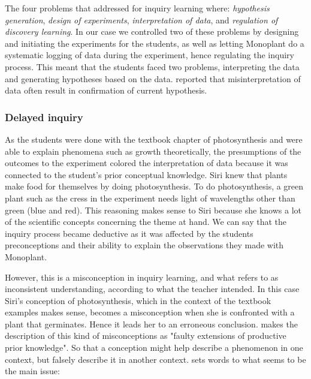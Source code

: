 The four problems that \citet{de1998scientific} addressed for inquiry learning where: \textit{hypothesis generation}, \textit{design of experiments}, \textit{interpretation of data}, and \textit{regulation of discovery learning}. In our case we controlled two of these problems by designing and initiating the experiments for the students, as well as letting Monoplant do a systematic logging of data during the experiment, hence regulating the inquiry process. This meant that the students faced two problems, interpreting the data and generating hypotheses based on the data. \citeauthor*{klahr1993heuristics} \citetext{\citeyear{klahr1993heuristics}, referenced in \citealp{de1998scientific}} reported that misinterpretation of data often result in confirmation of current hypothesis. 



\subsubsection*{Delayed inquiry}
As the students were done with the textbook chapter of photosynthesis and were able to explain  phenomena such as growth theoretically, the presumptions of the outcomes to the experiment colored the interpretation of data because it was connected to the student's prior conceptual knowledge. Siri knew that plants make food for themselves by doing photosynthesis. To do photosynthesis, a green plant such as the cress in the experiment needs light of wavelengths other than green (blue and red). This reasoning makes sense to Siri because she knows a lot of the scientific concepts concerning the theme at hand. We can say that the inquiry process became deductive as it was affected by the students preconceptions and their ability to explain the observations they made with Monoplant. 

However, this is a misconception in inquiry learning, and what \citet{gomez2008elementary} refers to as inconsistent understanding, according to what the teacher intended. In this case Siri's conception of photosynthesis, which in the context of the textbook examples makes sense, becomes a misconception when she is confronted with a plant that germinates. Hence it leads her to an erroneous conclusion. \citet{smith1994misconceptions} makes the description of this kind of misconceptions as "faulty extensions of productive prior knowledge". So that a conception might help describe a phenomenon in one context, but falsely describe it in another context. \citeauthor{klahr1993heuristics} sets words to what seems to be the main issue: 

